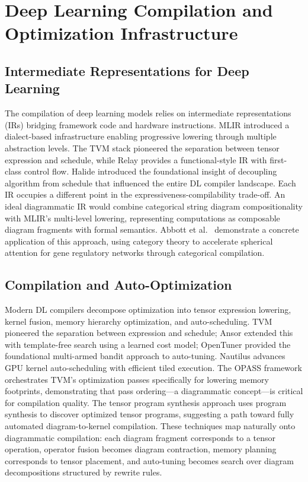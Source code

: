 \documentclass[12pt,a4paper]{article}
\begin{document}
\section{Deep Learning Compilation and Optimization Infrastructure}
\subsection{Intermediate Representations for Deep Learning}

The compilation of deep learning models relies on intermediate representations (IRs) bridging framework code and hardware instructions. MLIR \cite{lai2023relax} introduced a dialect-based infrastructure enabling progressive lowering through multiple abstraction levels. The TVM stack \cite{chen2018tvma} pioneered the separation between tensor expression and schedule, while Relay \cite{roesch2019relayah} provides a functional-style IR with first-class control flow. Halide \cite{ragankelley2017halide} introduced the foundational insight of decoupling algorithm from schedule that influenced the entire DL compiler landscape. Each IR occupies a different point in the expressiveness-compilability trade-off. An ideal diagrammatic IR would combine categorical string diagram compositionality with MLIR's multi-level lowering, representing computations as composable diagram fragments with formal semantics. Abbott et al.~\cite{abbott2025accelerating} demonstrate a concrete application of this approach, using category theory to accelerate spherical attention for gene regulatory networks through categorical compilation.

\subsection{Compilation and Auto-Optimization}

Modern DL compilers decompose optimization into tensor expression lowering, kernel fusion, memory hierarchy optimization, and auto-scheduling. TVM \cite{chen2018tvma} pioneered the separation between expression and schedule; Ansor \cite{zheng2020ansor} extended this with template-free search using a learned cost model; OpenTuner \cite{ansel2014opentuner} provided the foundational multi-armed bandit approach to auto-tuning. Nautilus \cite{zhao2026nautilus} advances GPU kernel auto-scheduling with efficient tiled execution. The OPASS framework \cite{nie2024opassot} orchestrates TVM's optimization passes specifically for lowering memory footprints, demonstrating that pass ordering---a diagrammatic concept---is critical for compilation quality. The tensor program synthesis approach \cite{alexander2025tensor} uses program synthesis to discover optimized tensor programs, suggesting a path toward fully automated diagram-to-kernel compilation. These techniques map naturally onto diagrammatic compilation: each diagram fragment corresponds to a tensor operation, operator fusion becomes diagram contraction, memory planning corresponds to tensor placement, and auto-tuning becomes search over diagram decompositions structured by rewrite rules.
\end{document}
